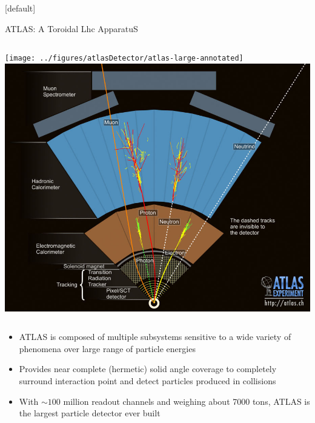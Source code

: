 \documentclass{beamer}
\begin{document}
{  \makeatletter %
  [default]
  \def\beamer@entrycode{\vspace*{-1.075\headheight}}
  \begin{frame}{ATLAS: A T\lowercase{oroidal} L\lowercase{HC} A\lowercase{pparatu}S }
    \vspace{10pt}
    \begin{columns}
      \texttt{[image: ../figures/atlasDetector/atlas-large-annotated]}
      \includegraphics[width=\textwidth]{figures/ATLASslice}
    \end{columns}
    \begin{itemize}\small
    \item ATLAS is composed of multiple subsystems sensitive to a wide variety of phenomena over large range of particle energies
    \item Provides near complete (hermetic) solid angle coverage to completely surround interaction point and detect particles produced in collisions
    \item With $\sim100$ million readout channels and weighing about 7000 tons, ATLAS is the largest particle detector ever built
    \end{itemize}
  \end{frame}

}
\end{document}
